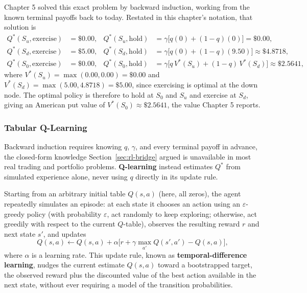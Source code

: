 \documentclass[../ai_in_finance]{subfiles}
\begin{document}
Chapter 5 solved this exact problem by backward induction, working from the known terminal payoffs back to today. Restated in this chapter's notation, that solution is
\begin{align*}
Q^*(S_u, \text{exercise}) &= \$0.00, & Q^*(S_u, \text{hold}) &= \gamma\big[q(0) + (1-q)(0)\big] = \$0.00,\\
Q^*(S_d, \text{exercise}) &= \$5.00, & Q^*(S_d, \text{hold}) &= \gamma\big[q(0) + (1-q)(9.50)\big] \approx \$4.8718,\\
Q^*(S_0, \text{exercise}) &= \$0.00, & Q^*(S_0, \text{hold}) &= \gamma\big[q\,V^*(S_u) + (1-q)\,V^*(S_d)\big] \approx \$2.5641,
\end{align*}
where $V^*(S_u)=\max(0.00,0.00)=\$0.00$ and $V^*(S_d)=\max(5.00,4.8718)=\$5.00$, since exercising is optimal at the down node. The optimal policy is therefore to hold at $S_0$ and $S_u$ and exercise at $S_d$, giving an American put value of $V^*(S_0) \approx \$2.5641$, the value Chapter 5 reports.

\subsubsection*{Tabular Q-Learning}

Backward induction requires knowing $q$, $\gamma$, and every terminal payoff in advance, the closed-form knowledge Section~\ref{sec:rl-bridge} argued is unavailable in most real trading and portfolio problems. \textbf{Q-learning} instead estimates $Q^*$ from simulated experience alone, never using $q$ directly in its update rule.

Starting from an arbitrary initial table $Q(s,a)$ (here, all zeros), the agent repeatedly simulates an episode: at each state it chooses an action using an $\varepsilon$-greedy policy (with probability $\varepsilon$, act randomly to keep exploring; otherwise, act greedily with respect to the current $Q$-table), observes the resulting reward $r$ and next state $s'$, and updates
\begin{equation*}
Q(s,a) \leftarrow Q(s,a) + \alpha\Big[r + \gamma \max_{a'} Q(s',a') - Q(s,a)\Big],
\end{equation*}
where $\alpha$ is a learning rate. This update rule, known as \textbf{temporal-difference learning}, nudges the current estimate $Q(s,a)$ toward a bootstrapped target, the observed reward plus the discounted value of the best action available in the next state, without ever requiring a model of the transition probabilities.
\end{document}
